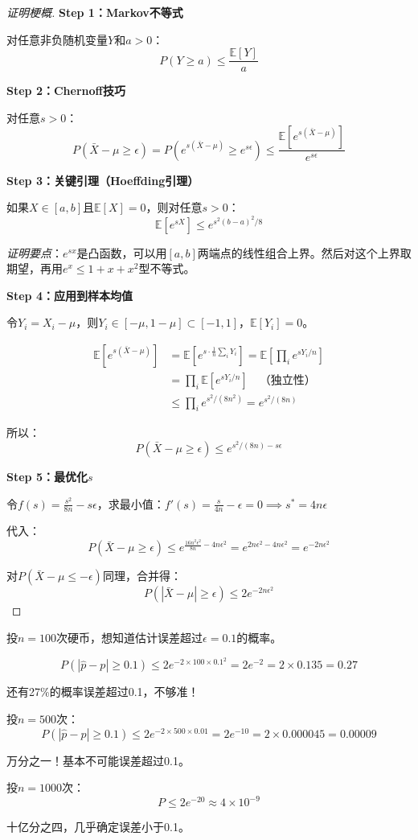 \documentclass[11pt,a4paper]{article}
\theoremstyle{definition}
\begin{document}
\begin{proof}[证明梗概]
\textbf{Step 1：Markov不等式}

对任意非负随机变量$Y$和$a > 0$：
\[
P(Y \geq a) \leq \frac{\mathbb{E}[Y]}{a}
\]

\textbf{Step 2：Chernoff技巧}

对任意$s > 0$：
\[
P(\bar{X} - \mu \geq \epsilon) = P(e^{s(\bar{X} - \mu)} \geq e^{s\epsilon}) \leq \frac{\mathbb{E}[e^{s(\bar{X} - \mu)}]}{e^{s\epsilon}}
\]

\textbf{Step 3：关键引理（Hoeffding引理）}

如果$X \in [a, b]$且$\mathbb{E}[X] = 0$，则对任意$s > 0$：
\[
\mathbb{E}[e^{sX}] \leq e^{s^2(b-a)^2/8}
\]

\textit{证明要点}：$e^{sx}$是凸函数，可以用$[a,b]$两端点的线性组合上界。然后对这个上界取期望，再用$e^x \leq 1 + x + x^2$型不等式。

\textbf{Step 4：应用到样本均值}

令$Y_i = X_i - \mu$，则$Y_i \in [-\mu, 1-\mu] \subset [-1, 1]$，$\mathbb{E}[Y_i] = 0$。

\begin{align*}
\mathbb{E}[e^{s(\bar{X} - \mu)}] &= \mathbb{E}\left[e^{s \cdot \frac{1}{n}\sum_i Y_i}\right] = \mathbb{E}\left[\prod_i e^{sY_i/n}\right] \\
&= \prod_i \mathbb{E}[e^{sY_i/n}] \quad \text{（独立性）} \\
&\leq \prod_i e^{s^2/(8n^2)} = e^{s^2/(8n)}
\end{align*}

所以：
\[
P(\bar{X} - \mu \geq \epsilon) \leq e^{s^2/(8n) - s\epsilon}
\]

\textbf{Step 5：最优化$s$}

令$f(s) = \frac{s^2}{8n} - s\epsilon$，求最小值：$f'(s) = \frac{s}{4n} - \epsilon = 0 \implies s^* = 4n\epsilon$

代入：
\[
P(\bar{X} - \mu \geq \epsilon) \leq e^{\frac{16n^2\epsilon^2}{8n} - 4n\epsilon^2} = e^{2n\epsilon^2 - 4n\epsilon^2} = e^{-2n\epsilon^2}
\]

对$P(\bar{X} - \mu \leq -\epsilon)$同理，合并得：
\[
P(|\bar{X} - \mu| \geq \epsilon) \leq 2e^{-2n\epsilon^2}
\]
\end{proof}

\begin{calculation}[投硬币的例子]
投$n=100$次硬币，想知道估计误差超过$\epsilon = 0.1$的概率。

\[
P(|\hat{p} - p| \geq 0.1) \leq 2e^{-2 \times 100 \times 0.1^2} = 2e^{-2} = 2 \times 0.135 = 0.27
\]

还有27\%的概率误差超过0.1，不够准！

投$n=500$次：
\[
P(|\hat{p} - p| \geq 0.1) \leq 2e^{-2 \times 500 \times 0.01} = 2e^{-10} = 2 \times 0.000045 = 0.00009
\]

万分之一！基本不可能误差超过0.1。

投$n=1000$次：
\[
P \leq 2e^{-20} \approx 4 \times 10^{-9}
\]

十亿分之四，几乎确定误差小于0.1。
\end{calculation}
\end{document}
